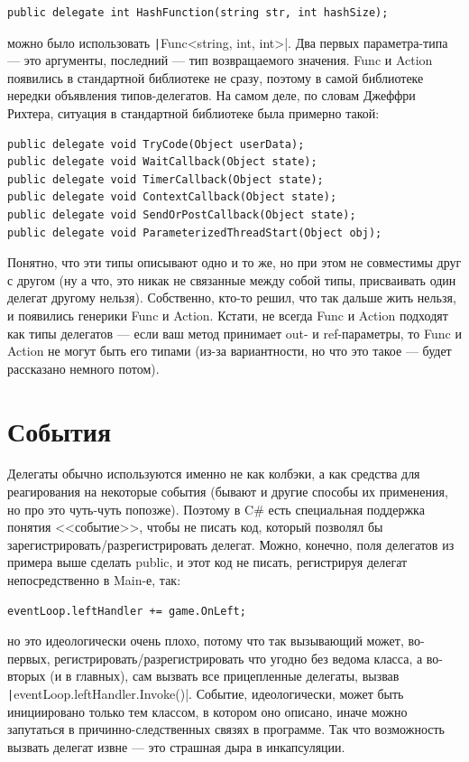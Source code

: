 \documentclass[a5paper]{article}
\begin{document}
\begin{verbatim}
public delegate int HashFunction(string str, int hashSize);
\end{verbatim}

можно было использовать \texttt|Func<string, int, int>|. Два первых параметра-типа --- это аргументы, последний --- тип возвращаемого значения. Func и Action появились в стандартной библиотеке не сразу, поэтому в самой библиотеке нередки объявления типов-делегатов. На самом деле, по словам Джеффри Рихтера, ситуация в стандартной библиотеке была примерно такой:

\begin{verbatim}
public delegate void TryCode(Object userData);
public delegate void WaitCallback(Object state);
public delegate void TimerCallback(Object state);
public delegate void ContextCallback(Object state);
public delegate void SendOrPostCallback(Object state);
public delegate void ParameterizedThreadStart(Object obj);
\end{verbatim}

Понятно, что эти типы описывают одно и то же, но при этом не совместимы друг с другом (ну а что, это никак не связанные между собой типы, присваивать один делегат другому нельзя). Собственно, кто-то решил, что так дальше жить нельзя, и появились генерики Func и Action. Кстати, не всегда Func и Action подходят как типы делегатов --- если ваш метод принимает out- и ref-параметры, то Func и Action не могут быть его типами (из-за вариантности, но что это такое --- будет рассказано немного потом).

\section{События}

Делегаты обычно используются именно не как колбэки, а как средства для реагирования на некоторые события (бывают и другие способы их применения, но про это чуть-чуть попозже). Поэтому в C\# есть специальная поддержка понятия <<событие>>, чтобы не писать код, который позволял бы зарегистрировать/разрегистрировать делегат. Можно, конечно, поля делегатов из примера выше сделать public, и этот код не писать, регистрируя делегат непосредственно в Main-е, так:

\begin{verbatim}
eventLoop.leftHandler += game.OnLeft;
\end{verbatim}

но это идеологически очень плохо, потому что так вызывающий может, во-первых, регистрировать/разрегистрировать что угодно без ведома класса, а во-вторых (и в главных), сам вызвать все прицепленные делегаты, вызвав \texttt|eventLoop.leftHandler.Invoke()|. Событие, идеологически, может быть инициировано только тем классом, в котором оно описано, иначе можно запутаться в причинно-следственных связях в программе. Так что возможность вызвать делегат извне --- это страшная дыра в инкапсуляции.
\end{document}

